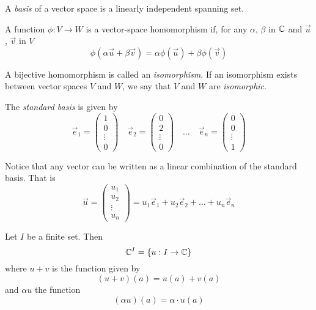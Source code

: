 \begin{definition}[Basis]
    A \emph{basis} of a vector space is a linearly independent spanning set.
\end{definition}

\begin{definition}[Homomorphism]
    A function $\phi:V \to W$ is a vector-space homomorphism if, for any $\alpha$, $\beta$
    in $\mathbb{C}$ and $\vec{u}$, $\vec{v}$ in $V$
    \[\phi(\alpha\vec{u} + \beta\vec{v}) = \alpha\phi(\vec{u}) + \beta\phi(\vec{v})\]

    A bijective homomorphism is called an \emph{isomorphism}. If an isomorphism exists
    between vector spaces $V$ and $W$, we say that $V$ and $W$ are \emph{isomorphic}.
\end{definition}

The \emph{standard basis} is given by
\[\vec{e}_1 = \begin{pmatrix}1\\0\\\vdots\\0\end{pmatrix} \quad \vec{e}_2 = \begin{pmatrix}0\\2\\\vdots\\0\end{pmatrix} \quad\dots\quad \vec{e}_n = \begin{pmatrix}0\\0\\\vdots\\1\end{pmatrix}\]

Notice that any vector can be written as a linear combination of the standard basis.
That is
\[\vec{u} = \begin{pmatrix}u_1\\u_2\\\vdots\\u_n\end{pmatrix} = u_1\vec{e}_1 + u_2\vec{e}_2 + \dots + u_n\vec{e}_n\]

\begin{definition}
    Let $I$ be a finite set. Then
    \[\mathbb{C}^I = \left\lbrace u: I \to \mathbb{C}\right\rbrace\]
    where $u + v$ is the function given by
    \[(u + v)(a) = u(a) + v(a)\]
    and $\alpha u$ the function
    \[(\alpha u)(a) = \alpha\cdot u(a)\]
\end{definition}

